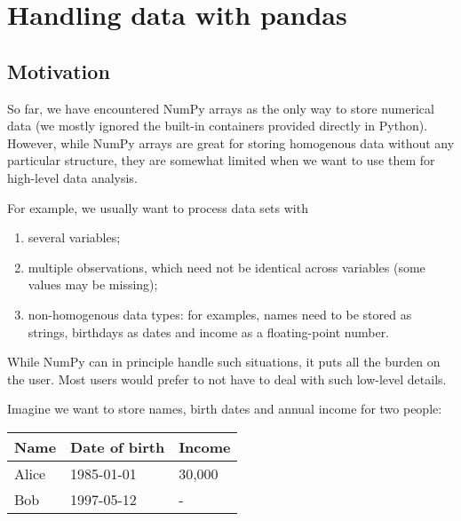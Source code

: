 \documentclass[10pt]{scrartcl}
\providecommand{\tightlist}{%
      \setlength{\itemsep}{0pt}\setlength{\parskip}{0pt}}
\begin{document}
    
    \maketitle
    \tableofcontents

    

    
    \hypertarget{handling-data-with-pandas}{%
\section{Handling data with pandas}\label{handling-data-with-pandas}}

\hypertarget{motivation}{%
\subsection{Motivation}\label{motivation}}

So far, we have encountered NumPy arrays as the only way to store
numerical data (we mostly ignored the built-in containers provided
directly in Python). However, while NumPy arrays are great for storing
homogenous data without any particular structure, they are somewhat
limited when we want to use them for high-level data analysis.

For example, we usually want to process data sets with

\begin{enumerate}
\def\labelenumi{\arabic{enumi}.}
\tightlist
\item
  several variables;
\item
  multiple observations, which need not be identical across variables
  (some values may be missing);
\item
  non-homogenous data types: for examples, names need to be stored as
  strings, birthdays as dates and income as a floating-point number.
\end{enumerate}

While NumPy can in principle handle such situations, it puts all the
burden on the user. Most users would prefer to not have to deal with
such low-level details.

Imagine we want to store names, birth dates and annual income for two
people:

\begin{longtable}[]{@{}lll@{}}
\toprule
Name & Date of birth & Income\tabularnewline
\midrule
\endhead
Alice & 1985-01-01 & 30,000\tabularnewline
Bob & 1997-05-12 & -\tabularnewline
\bottomrule
\end{longtable}
\end{document}

